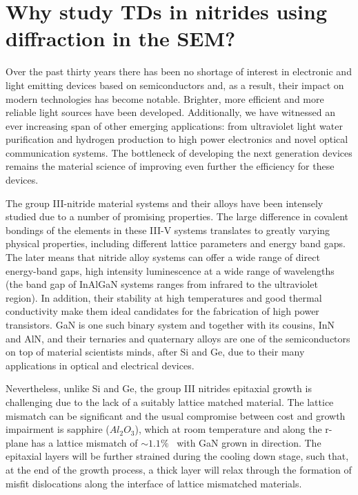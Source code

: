 \section{Why study TDs in nitrides using diffraction in the SEM?}
\label{sec:ECCITDmotivation}
Over the past thirty years there has been no shortage of interest in electronic and light emitting devices based on semiconductors and, as a result, their impact on modern technologies has become notable. Brighter, more efficient and more reliable light sources have been developed. Additionally, we have witnessed an ever increasing  span of other emerging applications: from ultraviolet light water purification and hydrogen production to high power electronics and novel optical communication systems. The bottleneck of developing the next generation devices remains the material science of improving even further the efficiency for these devices.

The group III-nitride material systems and their alloys have been intensely studied due to a number of promising properties. The large difference in covalent bondings of the elements in these III-V systems translates to greatly varying physical properties, including different lattice parameters and energy band gaps. The later means that nitride alloy systems can offer a wide range of direct energy-band gaps, \ie high intensity luminescence at a wide range of wavelengths (\eg the band gap of InAlGaN systems ranges from infrared to the ultraviolet region).  In addition, their stability at high temperatures and good thermal conductivity make them ideal candidates for the fabrication of high power transistors. GaN is one such binary system and together with its cousins, InN and AlN, and their ternaries and quaternary alloys are one of the semiconductors on top of material scientists minds, after Si and Ge, due to their many applications in optical and electrical devices.  

Nevertheless, unlike Si and Ge, the group III nitrides epitaxial growth is challenging due to the lack of a suitably lattice matched material. The lattice mismatch can be significant and the usual compromise between cost and growth impairment is sapphire ($Al_2O_3$), which at room temperature and along the r-plane has a lattice mismatch of $\sim1.1\%$~\cite{nitrides} with GaN grown in \hkl[0001] direction. The epitaxial layers will be further strained during the cooling down stage, such that, at the end of the growth process, a thick layer will relax through the formation of misfit dislocations along the interface of lattice mismatched materials.

